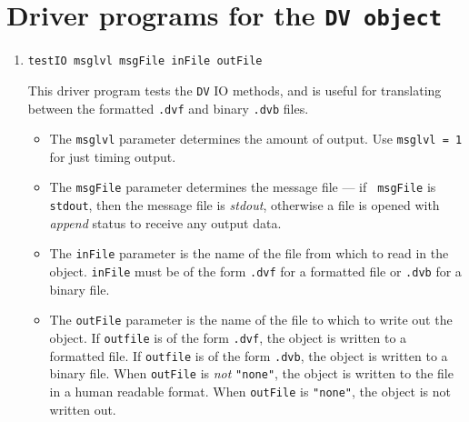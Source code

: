 \par
\section{Driver programs for the {\tt DV object}}
\label{section:DV:drivers}
\par
\begin{enumerate}
\item
\begin{verbatim}
testIO msglvl msgFile inFile outFile
\end{verbatim}
This driver program tests the {\tt DV} IO methods,
and is useful for translating between the formatted {\tt *.dvf}
and binary {\tt *.dvb} files.
\par
\begin{itemize}
\item
The {\tt msglvl} parameter determines the amount of output.
Use {\tt msglvl = 1} for just timing output.
\item
The {\tt msgFile} parameter determines the message file --- if {\tt
msgFile} is {\tt stdout}, then the message file is {\it stdout},
otherwise a file is opened with {\it append} status to receive any
output data.
\item
The {\tt inFile} parameter is the name of the file 
from which to read in the object.
{\tt inFile} must be of the form {\tt *.dvf} for a formatted file
or {\tt *.dvb} for a binary file.
\item
The {\tt outFile} parameter is the name of the file 
to which to write out the object.
If {\tt outfile} is of the form {\tt *.dvf}, the object is written
to a formatted file.
If {\tt outfile} is of the form {\tt *.dvb}, the object is written
to a binary file.
When {\tt outFile} is {\it not} {\tt "none"}, 
the object is written to the file in a human readable format.
When {\tt outFile} is {\tt "none"}, the object is not written out.
\end{itemize}
\end{enumerate}
